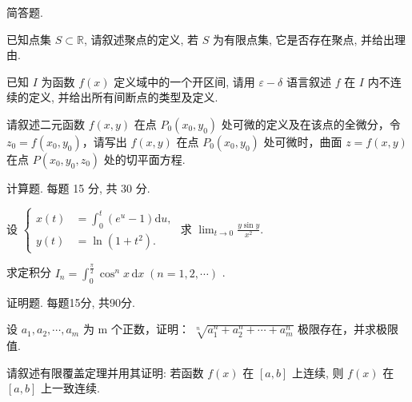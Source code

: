 \par{}
简答题.\par
已知点集 $S \subset \mathbb{R}$, 请叙述聚点的定义, 若 $S$ 为有限点集, 它是否存在聚点, 并给出理由.\par
已知 $I$ 为函数 $f(x)$ 定义域中的一个开区间, 请用 $\varepsilon - \delta$ 语言叙述 $f$ 在 $I$ 内不连续的定义, 并给出所有间断点的类型及定义.\par
请叙述二元函数 $f(x, y)$ 在点 $P_0(x_0, y_0)$ 处可微的定义及在该点的全微分，令 $z_0 = f(x_0, y_0)$，请写出 $f(x, y)$ 在点 $P_0(x_0, y_0)$ 处可微时，曲面 $z = f(x, y)$ 在点 $P(x_0, y_0, z_0)$ 处的切平面方程.\par
\par{}
计算题. 每题 15 分, 共 30 分.\par
设  $\left\{\begin{aligned}x(t)&=\int_{0}^{t}(e^{u}-1)\mathrm{d}u,\\ y(t)&=\ln(1+t^{2}).\end{aligned}\right.$  求  $\lim_{t\to0}\frac{y\sin y}{x^{2}}.$\par
求定积分  $I_{n}=\int_{0}^{\frac{\pi}{2}}\cos^{n}x\,\mathrm{d}x\;(n=1,2,\cdots)$ .\par
\par{}
证明题. 每题15分, 共90分.\par
设  $a_{1}, a_{2}, \cdots, a_{m}$  为 m 个正数，证明： $\sqrt[n]{a_{1}^{n} + a_{2}^{n} + \cdots + a_{m}^{n}}$  极限存在，并求极限值.\par
请叙述有限覆盖定理并用其证明: 若函数 $f(x)$ 在 $[a, b]$ 上连续, 则 $f(x)$ 在 $[a, b]$ 上一致连续.\par
